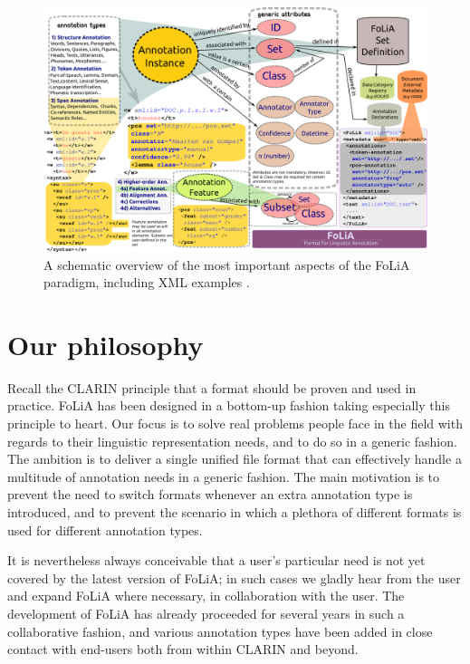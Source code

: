 \documentclass[a4paper,11pt]{article}
\begin{document}
\begin{figure}[h]
\begin{center}
\includegraphics[width=160.0mm]{folia_paradigm.png}
\end{center}
\caption{A schematic overview of the most important aspects of the FoLiA
paradigm, including XML examples \cite{FOLIADOC2014}.}
\label{fig:paradigm} 
\end{figure}

\section{Our philosophy}
\label{sec:philosophy}

Recall the CLARIN principle that a format should be proven and used in
practice. FoLiA has been designed in a bottom-up fashion taking especially this
principle to heart. Our focus is to solve real problems people face in the
field with regards to their linguistic representation needs, and to do so in a
generic fashion. The ambition is to deliver a single unified file format that
can effectively handle a multitude of annotation needs in a generic fashion.
The main motivation is to prevent the need to switch formats whenever an extra
annotation type is introduced, and to prevent the scenario in which a plethora
of different formats is used for different annotation types.

It is nevertheless always conceivable that a user's particular need is not yet
covered by the latest version of FoLiA; in such cases we gladly hear from the
user and expand FoLiA where necessary, in collaboration with the user. The
development of FoLiA has already proceeded for several years in such a
collaborative fashion, and various annotation types have been added in close
contact with end-users both from within CLARIN and beyond.
\end{document}
